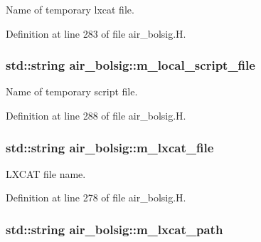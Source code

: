 Name of temporary lxcat file. 



Definition at line 283 of file air\+\_\+bolsig.\+H.

\subsubsection[{\texorpdfstring{m\+\_\+local\+\_\+script\+\_\+file}{m_local_script_file}}]{\setlength{\rightskip}{0pt plus 5cm}std\+::string air\+\_\+bolsig\+::m\+\_\+local\+\_\+script\+\_\+file\hspace{0.3cm}{\ttfamily [protected]}}\hypertarget{classair__bolsig_ae71a5e3e615ba0d1511a0527e0bffe23}{}\label{classair__bolsig_ae71a5e3e615ba0d1511a0527e0bffe23}


Name of temporary script file. 



Definition at line 288 of file air\+\_\+bolsig.\+H.

\subsubsection[{\texorpdfstring{m\+\_\+lxcat\+\_\+file}{m_lxcat_file}}]{\setlength{\rightskip}{0pt plus 5cm}std\+::string air\+\_\+bolsig\+::m\+\_\+lxcat\+\_\+file\hspace{0.3cm}{\ttfamily [protected]}}\hypertarget{classair__bolsig_a152aa89256eb186e1f193978a77c0305}{}\label{classair__bolsig_a152aa89256eb186e1f193978a77c0305}


L\+X\+C\+AT file name. 



Definition at line 278 of file air\+\_\+bolsig.\+H.

\subsubsection[{\texorpdfstring{m\+\_\+lxcat\+\_\+path}{m_lxcat_path}}]{\setlength{\rightskip}{0pt plus 5cm}std\+::string air\+\_\+bolsig\+::m\+\_\+lxcat\+\_\+path\hspace{0.3cm}{\ttfamily [protected]}}\hypertarget{classair__bolsig_a8c7a6ec683fb0837a02b6c0ecb481d62}{}\label{classair__bolsig_a8c7a6ec683fb0837a02b6c0ecb481d62}


